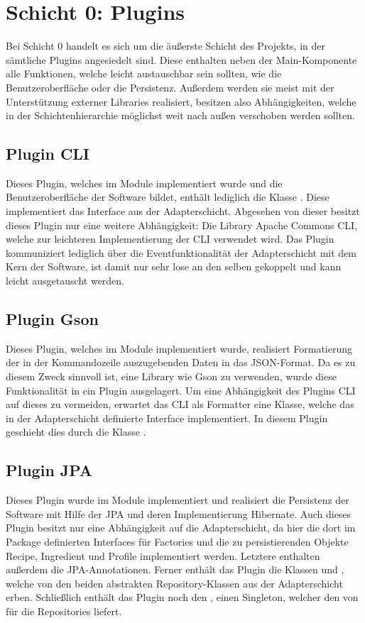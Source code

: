 \section{Schicht 0: Plugins}
Bei Schicht 0 handelt es sich um die äußerste Schicht des Projekts, in der sämtliche Plugins angesiedelt sind. Diese enthalten neben der Main-Komponente alle Funktionen, welche leicht austauschbar sein sollten, wie die Benutzeroberfläche oder die Persistenz. Außerdem werden sie meist mit der Unterstützung externer Libraries realisiert, besitzen also Abhängigkeiten, welche in der Schichtenhierarchie möglichst weit nach außen verschoben werden sollten.

\subsection{Plugin \acs{CLI}}
Dieses Plugin, welches im Module  implementiert wurde und die Benutzeroberfläche der Software bildet, enthält lediglich die Klasse . Diese implementiert das Interface  aus der Adapterschicht. Abgesehen von dieser besitzt dieses Plugin nur eine weitere Abhängigkeit: Die Library Apache Commons CLI, welche zur leichteren Implementierung der \ac{CLI} verwendet wird. Das Plugin kommuniziert lediglich über die Eventfunktionalität der Adapterschicht mit dem Kern der Software, ist damit nur sehr lose an den selben gekoppelt und kann leicht ausgetauscht werden.

\subsection{Plugin Gson}
Dieses Plugin, welches im Module  implementiert wurde, realisiert Formatierung der in der Kommandozeile auszugebenden Daten in das JSON-Format. Da es zu diesem Zweck sinnvoll ist, eine Library wie Gson zu verwenden, wurde diese Funktionalität in ein Plugin ausgelagert. Um eine Abhängigkeit des Plugins \acs{CLI} auf dieses zu vermeiden, erwartet das \ac{CLI} als Formatter eine Klasse, welche das in der Adapterschicht definierte Interface  implementiert. In diesem Plugin geschieht dies durch die Klasse .

\subsection{Plugin JPA}
Dieses Plugin wurde im Module  implementiert und realisiert die Persistenz der Software mit Hilfe der \ac{JPA} und deren Implementierung Hibernate. Auch dieses Plugin besitzt nur eine Abhängigkeit auf die Adapterschicht, da hier die dort im Package  definierten Interfaces für Factories und die zu persistierenden Objekte Recipe, Ingredient und Profile implementiert werden. Letztere enthalten außerdem die \ac{JPA}-Annotationen. Ferner enthält das Plugin die Klassen  und , welche von den beiden abstrakten Repository-Klassen aus der Adapterschicht erben. Schließlich enthält das Plugin noch den , einen Singleton, welcher den  von  für die Repositories liefert.


